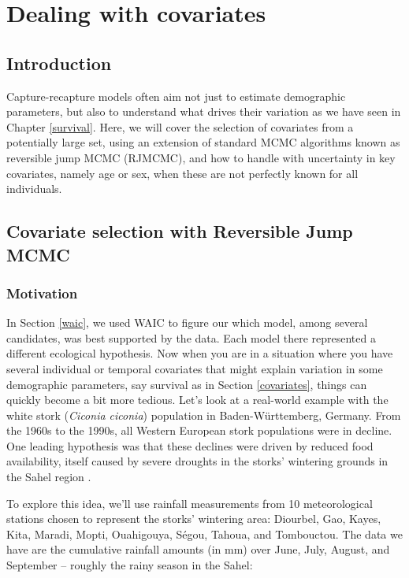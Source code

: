 \documentclass[
  12pt,
]{krantz}
\begin{document}
\chapter{Dealing with covariates}\label{covariateschapter}

\section{Introduction}\label{introduction-8}

Capture-recapture models often aim not just to estimate demographic parameters, but also to understand what drives their variation as we have seen in Chapter \ref{survival}. Here, we will cover the selection of covariates from a potentially large set, using an extension of standard MCMC algorithms known as reversible jump MCMC (RJMCMC), and how to handle with uncertainty in key covariates, namely age or sex, when these are not perfectly known for all individuals.

\section{Covariate selection with Reversible Jump MCMC}\label{covariate-selection-with-reversible-jump-mcmc}

\subsection{Motivation}\label{motivation}

In Section \ref{waic}, we used WAIC to figure our which model, among several candidates, was best supported by the data. Each model there represented a different ecological hypothesis. Now when you are in a situation where you have several individual or temporal covariates that might explain variation in some demographic parameters, say survival as in Section \ref{covariates}, things can quickly become a bit more tedious.
Let's look at a real-world example with the white stork (\emph{Ciconia ciconia}) population in Baden-Württemberg, Germany. From the 1960s to the 1990s, all Western European stork populations were in decline. One leading hypothesis was that these declines were driven by reduced food availability, itself caused by severe droughts in the storks' wintering grounds in the Sahel region \citep[e.g.][\citet{grosbois_assessing_2008}]{kanya90}.

To explore this idea, we'll use rainfall measurements from 10 meteorological stations chosen to represent the storks' wintering area: Diourbel, Gao, Kayes, Kita, Maradi, Mopti, Ouahigouya, Ségou, Tahoua, and Tombouctou. The data we have are the cumulative rainfall amounts (in mm) over June, July, August, and September -- roughly the rainy season in the Sahel:
\end{document}
